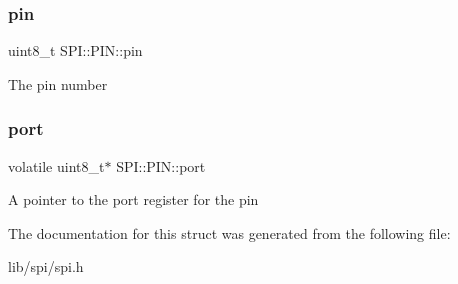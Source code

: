 \subsubsection{\texorpdfstring{pin}{pin}}
{\footnotesize\ttfamily uint8\+\_\+t S\+P\+I\+::\+P\+I\+N\+::pin}

The pin number \hypertarget{struct_s_p_i_1_1_p_i_n_a896a91638aa4958104d8a4db12757826}{}\label{struct_s_p_i_1_1_p_i_n_a896a91638aa4958104d8a4db12757826} 
\subsubsection{\texorpdfstring{port}{port}}
{\footnotesize\ttfamily volatile uint8\+\_\+t$\ast$ S\+P\+I\+::\+P\+I\+N\+::port}

A pointer to the port register for the pin 

The documentation for this struct was generated from the following file\+:\begin{DoxyCompactItemize}
\item 
lib/spi/spi.\+h\end{DoxyCompactItemize}
